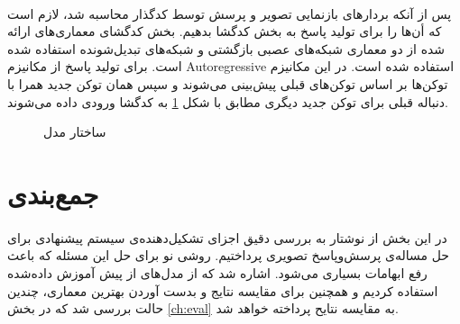 \paragraph{}{
    پس از آنکه بردارهای بازنمایی تصویر و پرسش توسط کدگذار محاسبه شد، لازم
    است که أن‌ها را برای تولید پاسخ به بخش کدگشا بدهیم. 
    بخش کدگشای معماری‌های ارائه شده از دو معماری شبکه‌های عصبی بازگشتی و 
    شبکه‌های تبدیل‌شونده استفاده شده است. برای تولید پاسخ از مکانیزم
    Autoregressive 
    استفاده شده است. در این مکانیزم توکن‌ها بر اساس توکن‌های قبلی پیش‌بینی می‌شوند
    و سپس همان توکن جدید همرا با دنباله قبلی برای توکن جدید دیگری مطابق با
    شکل 
    \ref{fig:decoder}
    به کدگشا 
    ورودی داده می‌شوند. 
    \begin{figure}[H]
        \caption{ساختار مدل }
        \label{fig:decoder}
    \end{figure}
}

\section{جمع‌بندی}
\paragraph{}{
    در این بخش از نوشتار به بررسی دقیق اجزای تشکیل‌دهنده‌ی سیستم پیشنهادی برای
    حل مسا‌له‌ی پرسش‌وپاسخ تصویری پرداختیم.
    روشی نو برای حل این‌ مسئله که باعث رفع ابهامات بسیاری می‌شود. اشاره شد که
    از مدل‌های از پیش آموزش داده‌شده استفاده کردیم و همچنین برای 
    مقایسه نتایج و بدست آوردن بهترین معماری، چندین حالت بررسی شد که در 
    بخش
    \ref{ch:eval}
    به مقایسه نتایح پرداخته‌ خواهد شد.
}